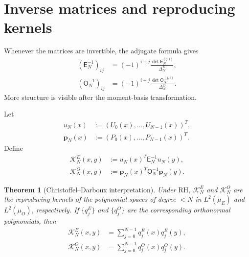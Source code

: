 \documentclass[preprint,12pt]{elsarticle}
\numberwithin{equation}{section}
\theoremstyle{plain}
\newtheorem{theorem}{Theorem}[section]
\theoremstyle{definition}
\theoremstyle{remark}
\newcommand{\RH}{\mathrm{RH}}
\newcommand{\E}{\mathsf E}
\newcommand{\Omat}{\mathsf O}
\begin{document}
\section{Inverse matrices and reproducing kernels}
\label{sec:inverse}

Whenever the matrices are invertible, the adjugate formula gives
\begin{align}
(\E_N^{-1})_{ij}
&=(-1)^{i+j}\frac{\det \E_N^{(j,i)}}{\Delta_N^E},
\label{eq:E_inverse_adjugate}\\
(\Omat_N^{-1})_{ij}
&=(-1)^{i+j}\frac{\det \Omat_N^{(j,i)}}{\Delta_N^O}.
\label{eq:O_inverse_adjugate}
\end{align}
More structure is visible after the moment-basis transformation.

Let
\begin{align}
u_N(x)&:=(U_0(x),\dots,U_{N-1}(x))^T,
\label{eq:uN_vector}\\
\mathbf p_N(x)&:=(P_0(x),\dots,P_{N-1}(x))^T.
\label{eq:pN_vector}
\end{align}
Define
\begin{align}
\mathcal K_N^E(x,y)
&:=u_N(x)^T\E_N^{-1}u_N(y),
\label{eq:KE_definition}\\
\mathcal K_N^O(x,y)
&:=\mathbf p_N(x)^T\Omat_N^{-1}\mathbf p_N(y).
\label{eq:KO_definition}
\end{align}

\begin{theorem}[Christoffel--Darboux interpretation]
\label{thm:inverse_CD}
Under $\RH$, $\mathcal K_N^E$ and $\mathcal K_N^O$ are the reproducing kernels of the polynomial spaces of degree $<N$ in $L^2(\mu_E)$ and $L^2(\mu_O)$, respectively. If $\{q_j^E\}$ and $\{q_j^O\}$ are the corresponding orthonormal polynomials, then
\begin{align}
\mathcal K_N^E(x,y)&=\sum_{j=0}^{N-1}q_j^E(x)q_j^E(y),
\label{eq:KE_orthonormal_sum}\\
\mathcal K_N^O(x,y)&=\sum_{j=0}^{N-1}q_j^O(x)q_j^O(y).
\label{eq:KO_orthonormal_sum}
\end{align}
\end{theorem}
\end{document}
